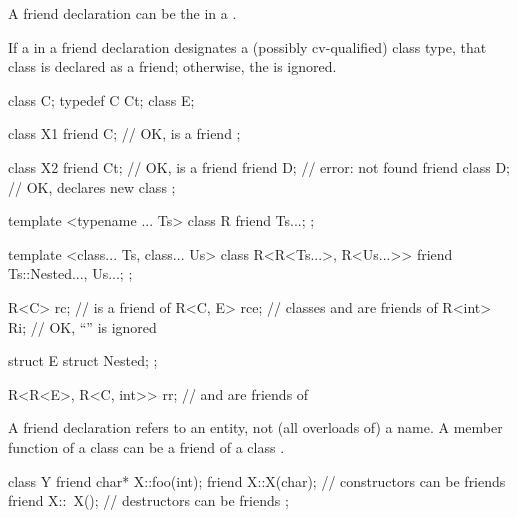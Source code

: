 \begin{note}
A friend declaration can be the
 in
a .
\end{note}
If a  in a friend declaration
designates a (possibly
cv-qualified) class type, that class is declared as a friend; otherwise, the
 is ignored.
\begin{example}
\begin{codeblock}
class C;
typedef C Ct;
class E;

class X1 {
  friend C;                     // OK,  is a friend
};

class X2 {
  friend Ct;                    // OK,  is a friend
  friend D;                     // error:  not found
  friend class D;               // OK,  declares new class
};

template <typename ... Ts> class R {
  friend Ts...;
};

template <class... Ts, class... Us>
class R<R<Ts...>, R<Us...>> {
  friend Ts::Nested..., Us...;
};

R<C> rc;                        //  is a friend of 
R<C, E> rce;                    // classes  and  are friends of 
R<int> Ri;                      // OK, ``'' is ignored

struct E { struct Nested; };

R<R<E>, R<C, int>> rr;          //  and  are friends of 
\end{codeblock}
\end{example}

\pnum
{}%
\begin{note}
A friend declaration refers to an entity, not (all overloads of) a name.
A member function of a class
can be a friend of
a class
.
%
\begin{example}
\begin{codeblock}
class Y {
  friend char* X::foo(int);
  friend X::X(char);            // constructors can be friends
  friend X::~X();               // destructors can be friends
};
\end{codeblock}
\end{example}
\end{note}

